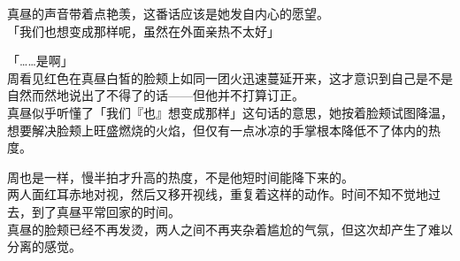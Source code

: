 真昼的声音带着点艳羡，这番话应该是她发自内心的愿望。\\

「我们也想变成那样呢，虽然在外面亲热不太好」

「……是啊」\\

周看见红色在真昼白皙的脸颊上如同一团火迅速蔓延开来，这才意识到自己是不是自然而然地说出了不得了的话——但他并不打算订正。\\

真昼似乎听懂了「我们『也』想变成那样」这句话的意思，她按着脸颊试图降温，想要解决脸颊上旺盛燃烧的火焰，但仅有一点冰凉的手掌根本降低不了体内的热度。

周也是一样，慢半拍才升高的热度，不是他短时间能降下来的。\\

两人面红耳赤地对视，然后又移开视线，重复着这样的动作。时间不知不觉地过去，到了真昼平常回家的时间。\\

真昼的脸颊已经不再发烫，两人之间不再夹杂着尴尬的气氛，但这次却产生了难以分离的感觉。

